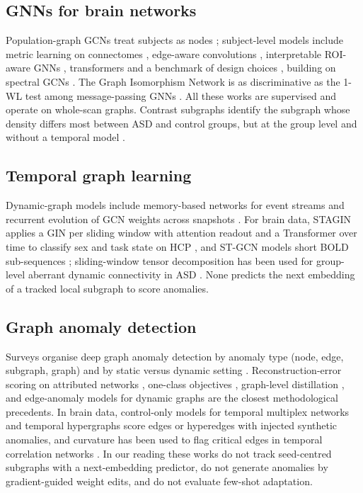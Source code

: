 \documentclass[conference]{IEEEtran}
\begin{document}
\subsection{GNNs for brain networks}
Population-graph GCNs treat subjects as nodes \cite{parisot2018}; subject-level models include metric learning on connectomes \cite{ktena2017}, edge-aware convolutions \cite{kawahara2017}, interpretable ROI-aware GNNs \cite{li2021braingnn}, transformers \cite{kan2022} and a benchmark of design choices \cite{cui2023}, building on spectral GCNs \cite{kipf2017}. The Graph Isomorphism Network is as discriminative as the 1-WL test among message-passing GNNs \cite{xu2019gin}. All these works are supervised and operate on whole-scan graphs. Contrast subgraphs identify the subgraph whose density differs most between ASD and control groups, but at the group level and without a temporal model \cite{lanciano2020}.

\subsection{Temporal graph learning}
Dynamic-graph models include memory-based networks for event streams \cite{rossi2020tgn} and recurrent evolution of GCN weights across snapshots \cite{pareja2020}. For brain data, STAGIN applies a GIN per sliding window with attention readout and a Transformer over time to classify sex and task state on HCP \cite{kim2021}, and ST-GCN models short BOLD sub-sequences \cite{gadgil2020}; sliding-window tensor decomposition has been used for group-level aberrant dynamic connectivity in ASD \cite{aggarwal2019}. None predicts the next embedding of a tracked local subgraph to score anomalies.

\subsection{Graph anomaly detection}
Surveys organise deep graph anomaly detection by anomaly type (node, edge, subgraph, graph) and by static versus dynamic setting \cite{ma2023survey,pang2021review}. Reconstruction-error scoring on attributed networks \cite{ding2019dominant}, one-class objectives \cite{ruff2018}, graph-level distillation \cite{ma2022glocal}, and edge-anomaly models for dynamic graphs \cite{yu2018netwalk,zheng2019addgraph} are the closest methodological precedents. In brain data, control-only models for temporal multiplex networks \cite{behrouz2023} and temporal hypergraphs \cite{sadeghian2024} score edges or hyperedges with injected synthetic anomalies, and curvature has been used to flag critical edges in temporal correlation networks \cite{chatterjee2021}. In our reading these works do not track seed-centred subgraphs with a next-embedding predictor, do not generate anomalies by gradient-guided weight edits, and do not evaluate few-shot adaptation.
\end{document}
